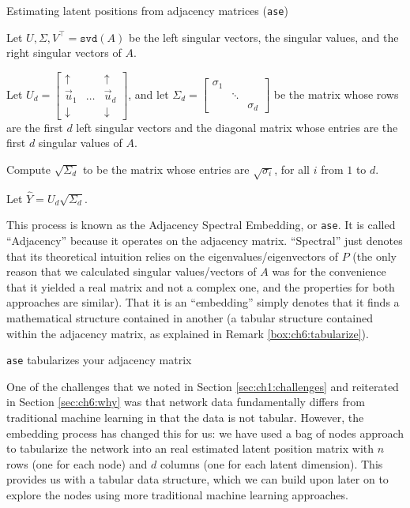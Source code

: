 \begin{algorithm}[h]\caption{Estimating latent positions from adjacency matrices (\texttt{ase})}
\label{alg:ch6:ase}
\SetAlgoLined
Let $U, \Sigma, V^\top = \texttt{svd}(A)$ be the left singular vectors, the singular values, and the right singular vectors of $A$.

Let $U_d = \begin{bmatrix}
    \uparrow & & \uparrow \\
    \vec u_1 & \hdots & \vec u_d \\
    \downarrow & & \downarrow
\end{bmatrix}$, and let $\Sigma_d = \begin{bmatrix}
    \sigma_1 & & \\
    & \ddots & \\
    & & \sigma_d
\end{bmatrix}$ be the matrix whose rows are the first $d$ left singular vectors and the diagonal matrix whose entries are the first $d$ singular values of $A$.

Compute $\sqrt{\Sigma_d}$ to be the matrix whose entries are $\sqrt{\sigma_i}$, for all $i$ from $1$ to $d$.

Let $\hat Y = U_d \sqrt{\Sigma_d}$.

\end{algorithm}

This process is known as the Adjacency Spectral Embedding, or \texttt{ase}. It is called ``Adjacency'' because it operates on the adjacency matrix. ``Spectral'' just denotes that its theoretical intuition relies on the eigenvalues/eigenvectors of $P$ (the only reason that we calculated singular values/vectors of $A$ was for the convenience that it yielded a real matrix and not a complex one, and the properties for both approaches are similar). That it is an ``embedding'' simply denotes that it finds a mathematical structure contained in another (a tabular structure contained within the adjacency matrix, as explained in Remark \ref{box:ch6:tabularize}). 


\begin{floatingbox}[h]\caption{\texttt{ase} tabularizes your adjacency matrix}
\label{box:ch6:tabularize}
One of the challenges that we noted in Section \ref{sec:ch1:challenges} and reiterated in Section \ref{sec:ch6:why} was that network data fundamentally differs from traditional machine learning in that the data is not tabular. However, the embedding process has changed this for us: we have used a bag of nodes approach to tabularize the network into an real estimated latent position matrix with $n$ rows (one for each node) and $d$ columns (one for each latent dimension). This provides us with a tabular data structure, which we can build upon later on to explore the nodes using more traditional machine learning approaches. 
\end{floatingbox}


